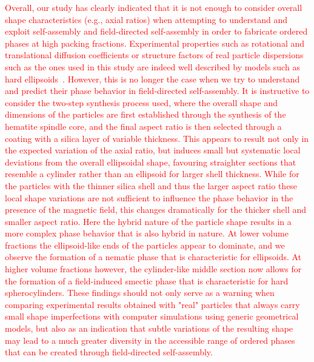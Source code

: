 \documentclass[aps,prl,preprint,superscriptaddress]{revtex4-1} %
\begin{document}
\textcolor{red}{Overall, our study has clearly indicated that it is not enough to consider overall shape characteristics (e.g., axial ratios) when attempting to understand and exploit self-assembly and field-directed self-assembly in order to fabricate ordered phases at high packing fractions. Experimental properties such as rotational and translational diffusion coefficients or structure factors of real particle dispersions such as the ones used in this study are indeed well described by models such as hard ellipsoids~\cite{martchenko2011,martchenko2016anisotropic,reufer2010morphology, reufer2012differential}. However, this is no longer the case when we try to understand and predict their phase behavior in field-directed self-assembly. It is instructive to consider the two-step synthesis process used, where the overall shape and dimensions of the particles are first established through the synthesis of the hematite spindle core, and the final aspect ratio is then selected through a coating with a silica layer of variable thickness. This appears to result not only in the expected variation of the axial ratio, but induces small but systematic local deviations from the overall ellipsoidal shape, favouring straighter sections that resemble a cylinder rather than an ellipsoid for larger shell thickness. While for the particles with the thinner silica shell and thus the larger aspect ratio these local shape variations are not sufficient to influence the phase behavior in the presence of the magnetic field, this changes dramatically for the thicker shell and smaller aspect ratio. Here the hybrid nature of the particle shape results in a more complex phase behavior that is also hybrid in nature. At lower volume fractions the ellipsoid-like ends of the particles appear to dominate, and we observe the formation of a nematic phase that is characteristic for ellipsoids. At higher volume fractions however, the cylinder-like middle section now allows for the formation of a field-induced smectic phase that is characteristic for hard spherocylinders. These findings should not only serve as a warning when comparing experimental results obtained with "real" particles that always carry small shape imperfections with computer simulations using generic geometrical models, but also as an indication that subtle variations of the resulting shape may lead to a much greater diversity in the accessible range of ordered phases that can be created through field-directed self-assembly.}\par
\end{document}
